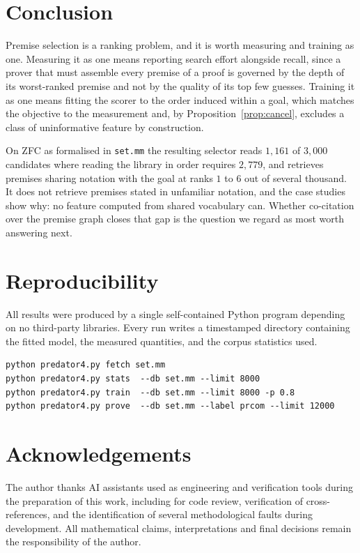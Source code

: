 \documentclass[11pt]{article}
\theoremstyle{plain}
\theoremstyle{definition}
\theoremstyle{remark}
\begin{document}
\section{Conclusion}

Premise selection is a ranking problem, and it is worth measuring and training as
one. Measuring it as one means reporting search effort alongside recall, since a
prover that must assemble every premise of a proof is governed by the depth of
its worst-ranked premise and not by the quality of its top few guesses. Training
it as one means fitting the scorer to the order induced within a goal, which
matches the objective to the measurement and, by Proposition~\ref{prop:cancel},
excludes a class of uninformative feature by construction.

On ZFC as formalised in \texttt{set.mm} the resulting selector reads $1{,}161$ of
$3{,}000$ candidates where reading the library in order requires $2{,}779$, and
retrieves premises sharing notation with the goal at ranks $1$ to $6$ out of
several thousand. It does not retrieve premises stated in unfamiliar notation,
and the case studies show why: no feature computed from shared vocabulary can.
Whether co-citation over the premise graph closes that gap is the question we
regard as most worth answering next.

\section*{Reproducibility}
All results were produced by a single self-contained Python program depending on
no third-party libraries. Every run writes a timestamped directory containing the
fitted model, the measured quantities, and the corpus statistics used.
\begin{lstlisting}
python predator4.py fetch set.mm
python predator4.py stats  --db set.mm --limit 8000
python predator4.py train  --db set.mm --limit 8000 -p 0.8
python predator4.py prove  --db set.mm --label prcom --limit 12000
\end{lstlisting}

\section*{Acknowledgements}
The author thanks AI assistants used as engineering and verification tools during
the preparation of this work, including for code review, verification of
cross-references, and the identification of several methodological faults during
development. All mathematical claims, interpretations and final decisions remain
the responsibility of the author.
\end{document}
